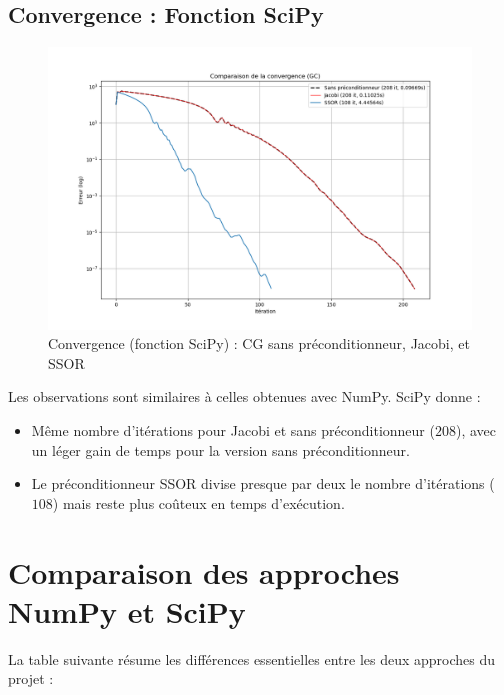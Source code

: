 \documentclass[12pt,a4paper]{article}
\begin{document}
    \subsection{Convergence : Fonction SciPy}
    \begin{figure}[h!]
        \centering
        \includegraphics[width=\textwidth]{Comparaison_de_la_convergence_scipy.png}
        \caption{Convergence (fonction SciPy) : CG sans préconditionneur, Jacobi, et SSOR}
        \label{fig:convergence_scipy}
    \end{figure}

    Les observations sont similaires à celles obtenues avec NumPy. SciPy donne :
    \begin{itemize}
        \item Même nombre d'itérations pour Jacobi et sans préconditionneur ($208$), avec un léger gain de temps pour la version sans préconditionneur.
        \item Le préconditionneur SSOR divise presque par deux le nombre d’itérations ($108$) mais reste plus coûteux en temps d'exécution.
    \end{itemize}



    \newpage
    \section{Comparaison des approches NumPy et SciPy}
	
	La table suivante résume les différences essentielles entre les deux approches du projet :
	
\end{document}
